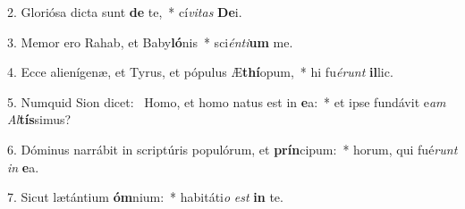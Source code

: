 2. Gloriósa dicta sunt \textbf{de} te,~*  cí\textit{vi}\textit{tas} \textbf{De}i.\

3. Memor ero Rahab, et Baby\textbf{ló}nis~*  sci\textit{én}\textit{ti}\textbf{um} me.\

4. Ecce alienígenæ, et Tyrus, et pópulus Æ\textbf{thí}opum,~*  hi fu\textit{é}\textit{runt} \textbf{il}lic.\

5. Numquid Sion dicet: \dag\  Homo, et homo natus est in \textbf{e}a:~*  et ipse fundávit e\textit{am} \textit{Al}\textbf{tís}simus?\

6. Dóminus narrábit in scriptúris populórum, et \textbf{prín}cipum:~*  horum, qui fué\textit{runt} \textit{in} \textbf{e}a.\

7. Sicut lætántium \textbf{óm}nium:~*  habitáti\textit{o} \textit{est} \textbf{in} te.\

